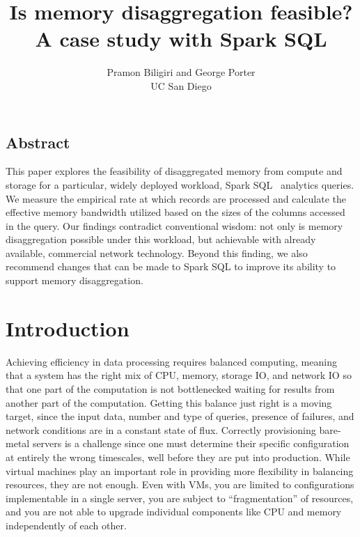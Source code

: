 \documentclass{sig-alternate-05-2015}
\begin{document}
 {}
\date{}


\title{Is memory disaggregation feasible?\\A case study with Spark SQL}

\author{Pramon Biligiri and George Porter\\UC San Diego}

\maketitle


\subsection*{Abstract}

This paper explores the feasibility of disaggregated memory from compute and
storage for a particular, widely deployed workload, Spark
SQL~\cite{Armbrust:2015:SSR:2723372.2742797} analytics queries.  We measure the
empirical rate at which records are processed and calculate the effective
memory bandwidth utilized based on the sizes of the columns accessed in the
query.  Our findings contradict conventional wisdom: not only is memory
disaggregation possible under this workload, but achievable with already
available, commercial network technology.  Beyond this finding, we also
recommend changes that can be made to Spark SQL to improve its ability to
support memory disaggregation.

\section{Introduction}

Achieving efficiency in data processing requires balanced computing, meaning
that a system has the right mix of CPU, memory, storage IO, and network IO so
that one part of the computation is not bottlenecked waiting for results from
another part of the computation.  Getting this balance just right is a moving
target, since the input data, number and type of queries, presence of failures,
and network conditions are in a constant state of flux.  Correctly provisioning
bare-metal servers is a challenge since one must determine their specific
configuration at entirely the wrong timescales, well before they are put into
production.  While virtual machines play an important role in providing more
flexibility in balancing resources, they are not enough.  Even with VMs, you are
limited to configurations implementable in a single server, you are subject to
``fragmentation'' of resources, and you are not able to
upgrade individual components like CPU and memory independently of each other.
\end{document}
